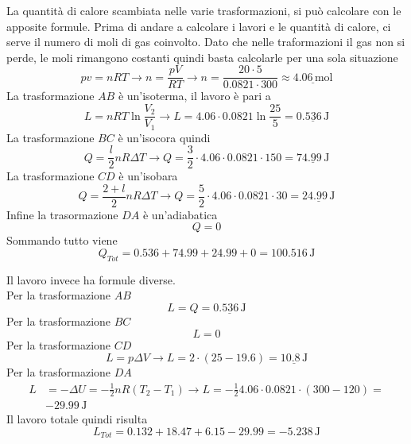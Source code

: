 La quantità di calore scambiata nelle varie trasformazioni, si può calcolare con le apposite formule.
Prima di andare a calcolare i lavori e le quantità di calore, ci serve il numero di moli di gas
coinvolto. Dato che nelle traformazioni il gas non si perde, le moli rimangono costanti quindi basta
calcolarle per una sola situazione
\begin{equation*}
pv=nRT \rightarrow n = \frac{pV}{RT}\rightarrow n =
\frac{20\cdot5}{0.0821\cdot300}\approx\underline{4.06\,\text{mol}}
\end{equation*}
La trasformazione $AB$ è un'isoterma, il lavoro è pari a 
\begin{equation*}
L = nRT\ln\frac{V_2}{V_1} \rightarrow L = 4.06\cdot0.0821\ln\frac{25}{5}= \underline{0.536\,\text{J}}
\end{equation*}
La trasformazione $BC$ è un'isocora quindi
\begin{equation*}
Q = \frac{l}{2}nR\Delta T \rightarrow Q =
\frac{3}{2}\cdot4.06\cdot0.0821\cdot150=\underline{74.99\,\text{J}}
\end{equation*}
La trasformazione $CD$ è un'isobara
\begin{equation*}
Q = \frac{2+l}{2}nR\Delta T\rightarrow Q =
\frac{5}{2}\cdot4.06\cdot0.0821\cdot30=\underline{24.99\,\text{J}}
\end{equation*}
Infine la trasormazione $DA$ è un'adiabatica
\begin{equation*}
Q = 0
\end{equation*}
Sommando tutto viene
\begin{equation*}
Q_{Tot} = 0.536+74.99+24.99+0=\boxed{100.516\,\text{J}}
\end{equation*}

Il lavoro invece ha formule diverse.\\
Per la trasformazione $AB$
\begin{equation*}
L=Q=\underline{0.536\,\text{J}}
\end{equation*}
Per la trasformazione $BC$
\begin{equation*}
L=0
\end{equation*}
Per la trasformazione $CD$
\begin{equation*}
L = p\Delta V\rightarrow L = 2\cdot(25-19.6) = \underline{10.8\,\text{J}}
\end{equation*}
Per la trasformazione $DA$
\begin{align*}
L &= -\Delta U = -\frac{1}{2}nR(T_2-T_1) \rightarrow L = -\frac{1}{2}4.06\cdot0.0821\cdot(300-120) =\\
&\boxed{-29.99\,\text{J}}
\end{align*}
Il lavoro totale quindi risulta
\begin{equation*}
L_{Tot} = 0.132 + 18.47+6.15-29.99 = \boxed{-5.238\,\text{J}}
\end{equation*}

